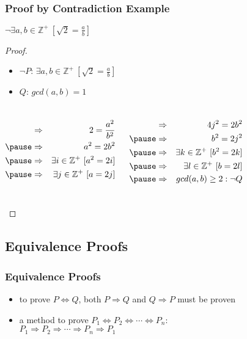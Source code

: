 \documentclass[dvipsnames]{beamer}
\begin{document}
\begin{frame}
  \frametitle{Proof by Contradiction Example}

  \begin{theorem}
    $\neg \exists a,b \in \mathbb{Z}^+~[\sqrt{2}=\frac{a}{b}]$
  \end{theorem}

  \pause
  \begin{proof}
    \begin{itemize}
      \item $\neg P$: $\exists a,b \in \mathbb{Z}^+~[\sqrt{2}=\frac{a}{b}]$
      \item $Q$: $gcd(a,b)=1$
    \end{itemize}

    \pause
    \vspace{-0.7cm}
    \begin{columns}[t]
      \begin{eqnarray*}
        & \Rightarrow & 2 = \frac{a^2}{b^2}\\\pause
        & \Rightarrow & a^2 = 2b^2\\\pause
        & \Rightarrow & \exists i \in \mathbb{Z}^+~[a^2=2i]\\\pause
        & \Rightarrow & \exists j \in \mathbb{Z}^+~[a=2j]
      \end{eqnarray*}

      \pause
      \begin{eqnarray*}
        & \Rightarrow & 4j^2 = 2b^2\\\pause
        & \Rightarrow & b^2 = 2j^2\\\pause
        & \Rightarrow & \exists k \in \mathbb{Z}^+~[b^2=2k]\\\pause
        & \Rightarrow & \exists l \in \mathbb{Z}^+~[b=2l]\\\pause
        & \Rightarrow & gcd(a,b) \geq 2: \neg Q
      \end{eqnarray*}
    \end{columns}
  \end{proof}
\end{frame}

\subsection{Equivalence Proofs}

\begin{frame}
  \frametitle{Equivalence Proofs}

  \begin{itemize}
    \item to prove $P \Leftrightarrow Q$, both $P \Rightarrow Q$ and
      $Q \Rightarrow P$ must be proven

    \pause
    \medskip
    \item a method to prove
      $P_1 \Leftrightarrow P_2 \Leftrightarrow \cdots \Leftrightarrow P_n$:\\
      $P_1 \Rightarrow P_2 \Rightarrow \cdots \Rightarrow P_n \Rightarrow P_1$
  \end{itemize}
\end{frame}
\end{document}
